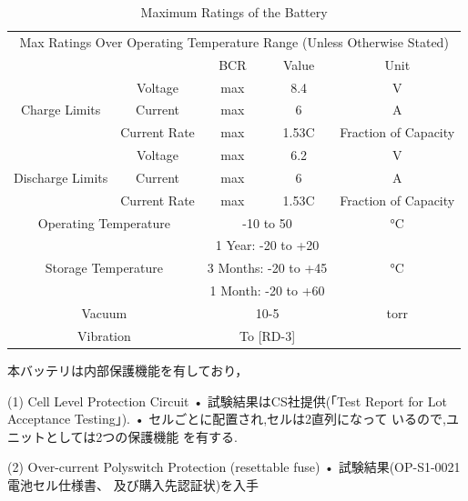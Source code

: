 \begin{table}
	\caption{Maximum Ratings of the Battery}
	\label{table3_1_bat_max}
	\centering
	\begin{tabular}{ccccc}
		\hline \hline
		\multicolumn{5}{c}{Max Ratings Over Operating Temperature Range (Unless Otherwise Stated)}\\
		&&BCR  & Value  &  Unit  \\
		\hline
		\multirow{3}{*}{Charge Limits}&Voltage&max&8.4&V\\
		&Current&max&6&A\\
		&Current Rate& max &1.53C &Fraction of Capacity\\
		\hline
		\multirow{3}{*}{Discharge Limits}&Voltage&max&6.2&V\\
		&Current&max&6&A\\
		&Current Rate& max &1.53C &Fraction of Capacity\\
		\hline
		\multicolumn{2}{c}{Operating Temperature}&\multicolumn{2}{c}{ -10 to 50} & °C\\
		\multicolumn{2}{c}{\multirow{3}{*}{Storage Temperature}}&\multicolumn{2}{c}{1 Year: -20 to +20}&\multirow{3}{*}{°C}\\
		&&\multicolumn{2}{c}{3 Months: -20 to +45}&\\
		&&\multicolumn{2}{c}{1 Month: -20 to +60}&\\
		\multicolumn{2}{c}{Vacuum}&\multicolumn{2}{c}{10-5}&torr\\
		\multicolumn{2}{c}{Vibration}&\multicolumn{2}{c}{To [RD-3]}\\
		\hline
	\end{tabular}
\end{table}
	

本バッテリは内部保護機能を有しており，


(1) Cell Level Protection Circuit
• 試験結果はCS社提供(「Test Report for Lot
Acceptance Testing」).
• セルごとに配置され,セルは2直列になって
いるので,ユニットとしては2つの保護機能
を有する.

(2) Over-current Polyswitch Protection
(resettable fuse)
• 試験結果(OP-S1-0021 電池セル仕様書、
及び購入先認証状)を入手


